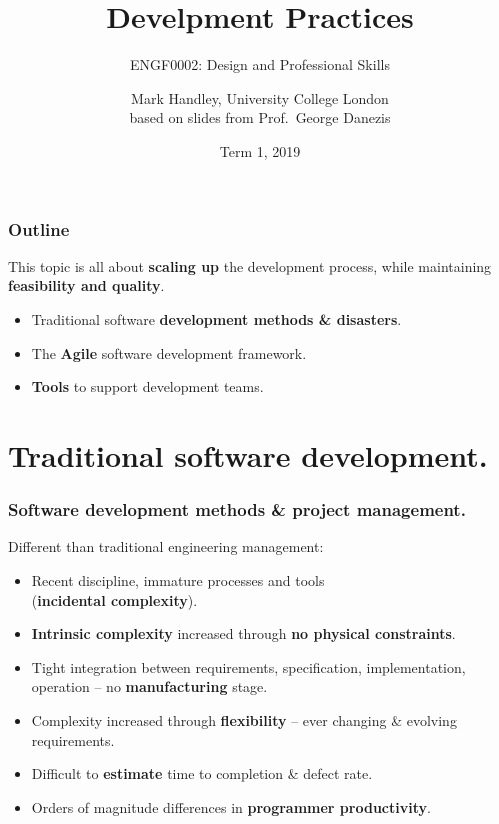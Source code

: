 \documentclass{beamer} %
\author{Mark Handley, University College London\\
\small  based on slides from Prof.\ George Danezis}
\title{Develpment Practices}
\subtitle{ENGF0002: Design and Professional Skills }
\date{Term 1, 2019}
\newcommand\emc[1]{\textcolor{midred}{\textbf{#1}}}
\begin{document}
\nobibliography*


\frame{
\titlepage
}

\begin{frame}
\frametitle{Outline}

This topic is all about \emc{scaling up} the development process, while maintaining \emc{feasibility and quality}.

\begin{itemize}
  \item Traditional software \emc{development methods \& disasters}.
  \item The \emc{Agile} software development framework.
  \item \emc{Tools} to support development teams.
\end{itemize}

\end{frame}

\section{Traditional software development.}

\begin{frame}
\frametitle{Software development methods \& project management.}

Different than traditional engineering management:
\begin{itemize}
  \item Recent discipline, immature processes and tools \\ (\emc{incidental complexity}).
  \item \emc{Intrinsic complexity} increased through \emc{no physical constraints}.
  \item Tight integration between requirements, specification, implementation, operation -- no \emc{manufacturing} stage.
  \item Complexity increased through \emc{flexibility} -- ever changing \& evolving requirements.
  \item Difficult to \emc{estimate} time to completion \& defect rate.
  \item Orders of magnitude differences in \emc{programmer productivity}.
\end{itemize}

\end{frame}
\end{document}
